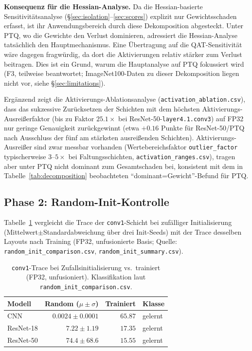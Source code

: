 \textbf{Konsequenz für die Hessian-Analyse.} Da die Hessian-basierte Sensitivitätsanalyse (\S\ref{sec:isolation}--\ref{sec:scores}) explizit nur Gewichtsschaden erfasst, ist ihr Anwendungsbereich durch diese Dekomposition abgesteckt. Unter PTQ, wo die Gewichte den Verlust dominieren, adressiert die Hessian-Analyse tatsächlich den Hauptmechanismus. Eine Übertragung auf die QAT-Sensitivität wäre dagegen fragwürdig, da dort die Aktivierungen relativ stärker zum Verlust beitragen. Dies ist ein Grund, warum die Hauptanalyse auf PTQ fokussiert wird (F3, teilweise beantwortet; ImageNet100-Daten zu dieser Dekomposition liegen nicht vor, siehe \S\ref{sec:limitations}).
\par\medskip

Ergänzend zeigt die Aktivierungs-Ablationsanalyse (\texttt{activation\_ablation.csv}), dass das sukzessive Zurücksetzen der Schichten mit dem höchsten Aktivierungs-Ausreißerfaktor (bis zu Faktor $25.1\times$ bei ResNet-50-\texttt{layer4.1.conv3}) auf FP32 nur geringe Genauigkeit zurückgewinnt (etwa $+0.16$ Punkte für ResNet-50/PTQ nach Ausschluss der fünf am stärksten ausreißenden Schichten). Aktivierungs-Ausreißer sind zwar messbar vorhanden (Wertebereichsfaktor \texttt{outlier\_factor} typischerweise $3$--$5\times$ bei Faltungsschichten, \texttt{activation\_ranges.csv}), tragen aber unter PTQ nicht dominant zum Gesamtschaden bei, konsistent mit dem in Tabelle~\ref{tab:decomposition} beobachteten \enquote{dominant=Gewicht}-Befund für PTQ.

\subsection{Phase 2: Random-Init-Kontrolle}
\label{sec:phase2}

Tabelle~\ref{tab:randominit} vergleicht die Trace der \texttt{conv1}-Schicht bei zufälliger Initialisierung (Mittelwert$\pm$Standardabweichung über drei Init-Seeds) mit der Trace desselben Layouts nach Training (FP32, unfusionierte Basis; Quelle: \texttt{random\_init\_comparison.csv}, \texttt{random\_init\_summary.csv}).

\begin{table}[t]
\centering
\small
\caption{\texttt{conv1}-Trace bei Zufallsinitialisierung vs.\ trainiert (FP32, unfusioniert). Klassifikation laut \texttt{random\_init\_comparison.csv}.}
\label{tab:randominit}
\begin{tabular}{lrrl}
\toprule
Modell & Random ($\mu\pm\sigma$) & Trainiert & Klasse \\
\midrule
CNN & $0.0024\pm0.0001$ & $65.87$ & gelernt \\
ResNet-18 & $7.22\pm1.19$ & $17.35$ & gelernt \\
ResNet-50 & $74.4\pm68.6$ & $15.55$ & gelernt \\
\bottomrule
\end{tabular}
\end{table}

